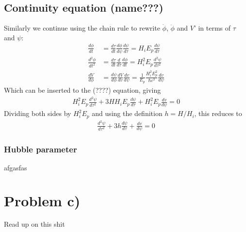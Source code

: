 \documentclass[reprint,english,notitlepage]{revtex4-1}  %
\numberwithin{equation}{section}
\begin{document}
\subsection{Continuity equation (name???)}
Similarly we continue using the chain rule to rewrite $\dot{\phi}$,
$\ddot{\phi}$ and $V$' in terms of $\tau$ and $\psi$:
\begin{align}
	\frac{d\phi}{dt} &= \frac{d\tau}{dt}\frac{d\phi}{d\psi}\frac{d\psi}{d\tau}
									 = H_i E_p \frac{d\psi}{d\tau} \\
  \frac{d^2\phi}{dt^2} &= \frac{d\tau}{dt}\frac{d}{d\tau}\frac{d\phi}{dt}
									 = H_i^2 E_p \frac{d^2\psi}{d\tau^2} \\
	\frac{dV}{d\phi} &= \frac{d\psi}{d\phi}\frac{dV}{dv}\frac{dv}{d\psi}
									 = \frac{1}{E_p} \frac{H_i^2 E_p^2}{\hbar c^3} \frac{dv}{d\psi}
\end{align}
Which can be inserted to the (????) equation, giving
\begin{align}
	H_i^2 E_p \frac{d^2\psi}{d\tau^2} + 3H H_i E_p \frac{d\psi}{d\tau}
				+ H_i^2 E_p \frac{dv}{d\psi} = 0
\end{align}
Dividing both sides by $H_i^2 E_p$ and using the definition $h=H/H_i$, this
reduces to
\begin{align}
	\frac{d^2\psi}{d\tau^2} + 3h\frac{d\psi}{d\tau} + \frac{dv}{d\psi} = 0
\end{align}
\subsubsection{Hubble parameter}
afgasfas

\section{Problem c)}
Read up on this shit
\end{document}
